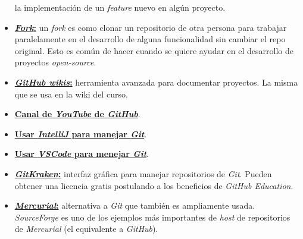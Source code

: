 \begin{itemize}
            la implementación de un \textit{feature} nuevo en algún proyecto.
          \item \href{https://guides.github.com/activities/forking/}{
            \textbf{\textit{Fork}:}} un \textit{fork} es como clonar un repositorio de 
            otra persona para trabajar paralelamente en el desarrollo de alguna 
            funcionalidad sin cambiar el repo original.
            Esto es común de hacer cuando se quiere ayudar en el desarrollo de proyectos 
            \textit{open-source}.
          \item \href{https://guides.github.com/features/wikis/}{
            \textbf{\textit{GitHub wikis}:}} herramienta avanzada para documentar 
            proyectos.
            La misma que se usa en la wiki del curso. 
          \item \href{https://www.youtube.com/githubguides}{\textbf{Canal de 
            \textit{YouTube} de \textit{GitHub}}}.
          \item \href{https://www.youtube.com/watch?v=uUzRMOCBorg}{\textbf{Usar 
            \textit{IntelliJ} para manejar \textit{Git}}}.
          \item  \href{https://code.visualstudio.com/docs/editor/versioncontrol}{
            \textbf{Usar \textit{VSCode} para menejar \textit{Git}}}.
          \item \href{https://www.gitkraken.com}{\textbf{\textit{GitKraken}:}} interfaz 
            gráfica para manejar repositorios de \textit{Git}.
            Pueden obtener una licencia gratis postulando a los beneficios de 
            \textit{GitHub Education}.
          \item \href{https://www.mercurial-scm.org}{\textbf{\textit{Mercurial}:}} 
            alternativa a \textit{Git} que también es ampliamente usada.
            \textit{SourceForge} es uno de los ejemplos más importantes de \textit{host} 
            de repositorios de \textit{Mercurial} (el equivalente a \textit{GitHub}).
        \end{itemize}